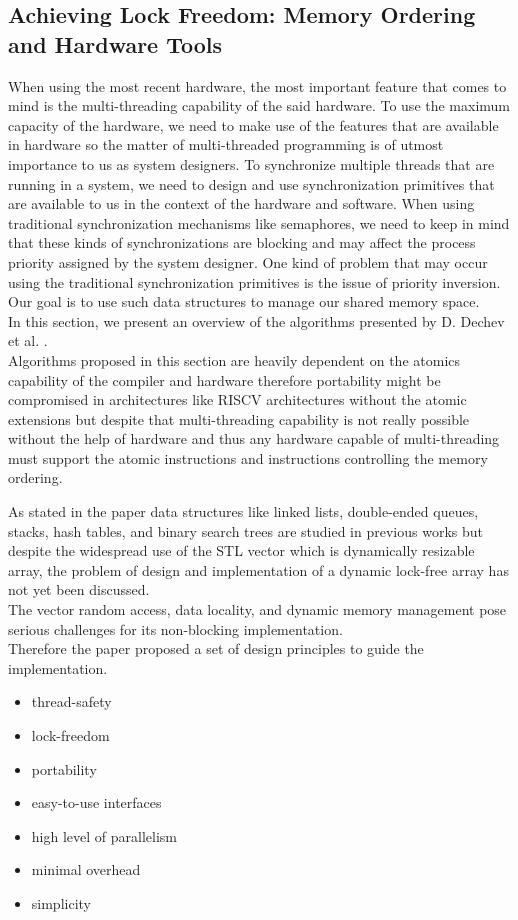 \documentclass[a4paper, 11pt, twocolumn]{article}
\theoremstyle{nonumberplain}
\begin{document}
\subsection{Achieving Lock Freedom: Memory Ordering and Hardware Tools}
When using the most recent hardware, the most important feature that comes to
mind is the multi-threading capability of the said hardware. To use
the maximum capacity of the hardware, we need to make use of the features that
are available in hardware so the matter of multi-threaded programming is of
utmost importance to us as system designers. To synchronize
multiple threads that are running in a system, we need to design and use
synchronization primitives that are available to us in the context of the
hardware and software. When using traditional synchronization mechanisms
like semaphores, we need to keep in mind that these kinds of synchronizations
are blocking and may affect the process priority assigned by the system
designer. One kind of problem that may occur using the traditional
synchronization primitives is the issue of priority inversion. Our goal is
to use such data structures to manage our shared memory space. \\
In this section, we present an overview of the algorithms presented by D. Dechev
et al. \cite{cas}. \\
Algorithms proposed in this section are heavily dependent on the atomics
capability of the compiler and hardware therefore portability might be
compromised in architectures like RISCV architectures without the atomic
extensions but despite that multi-threading capability is not really
possible without the help of hardware and thus any hardware capable of
multi-threading must support the atomic instructions and instructions
controlling the memory ordering.

As stated in the paper \cite{cas} data structures like linked lists,
double-ended queues,
stacks, hash tables, and binary search trees are studied in previous works but
despite the widespread use of the STL vector which is dynamically resizable
array, the problem of design and implementation of a dynamic lock-free array
has not yet been discussed. \\
The vector random access, data locality, and dynamic memory management pose
serious challenges for its non-blocking implementation. \\
Therefore the paper proposed a set of design principles to guide the
implementation.

\begin{itemize}
    \item thread-safety
    \item lock-freedom
    \item portability
    \item easy-to-use interfaces
    \item high level of parallelism
    \item minimal overhead
    \item simplicity
\end{itemize}
\end{document}
